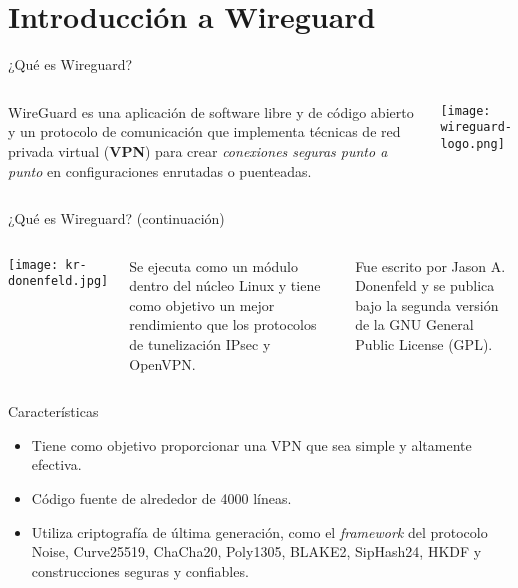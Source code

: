 
\section{Introducción a Wireguard}

\begin{frame}[c]{¿Qué es Wireguard?}
    \begin{columns}
        WireGuard es una aplicación de software libre y de código abierto
        y un protocolo de comunicación que implementa técnicas de red
        privada virtual (\textbf{VPN}) para crear \emph{conexiones seguras
        punto a punto} en configuraciones enrutadas o puenteadas.
        \begin{center}
            \texttt{[image: wireguard-logo.png]}
        \end{center}
    \end{columns}
\end{frame}

\begin{frame}[c]{¿Qué es Wireguard? (continuación)}
    \begin{columns}
        \begin{center}
            \texttt{[image: kr-donenfeld.jpg]}
        \end{center}
        Se ejecuta como un módulo dentro del núcleo Linux y tiene como
        objetivo un mejor rendimiento que los protocolos de tunelización
        IPsec y OpenVPN.

        \vspace{\baselineskip}
        Fue escrito por Jason A. Donenfeld y se publica bajo la segunda
        versión de la GNU General Public License (GPL).
    \end{columns}
\end{frame}

\begin{frame}[c]{Características}
  \begin{itemize}
    \item Tiene como objetivo proporcionar una VPN que sea
          simple y altamente efectiva.
    \pausa
    \item Código fuente de alrededor de 4000 líneas.
    \pausa
    \item Utiliza criptografía de última generación, como el \emph{framework}
          del protocolo Noise, Curve25519, ChaCha20, Poly1305, BLAKE2,
          SipHash24, HKDF y construcciones seguras y confiables.

  \end{itemize}
\end{frame}

